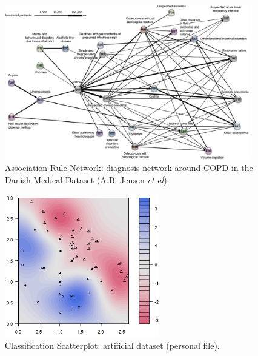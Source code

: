 \afterpage{\FloatBarrier}
\vfill
\newpage
\vfill
\begin{figure}[H]
\centering
\includegraphics[width=0.95\textwidth]{images/DV/COPD.png}
\caption[\small Association Rule Network: Danish Medical Dataset ]{\small Association Rule Network: diagnosis network around COPD in the Danish Medical Dataset (A.B. Jensen \textit{et al}).} \label{fig:ex_arn_copd}
\end{figure}
\afterpage{\FloatBarrier}
\vfill
\begin{figure}[H]
\centering
\includegraphics[width=0.6\textwidth]{images/DV/fig9.png}
\caption[\small Classification Scatterplot: artificial dataset ]{\small Classification Scatterplot: artificial dataset (personal file).} \label{fig:ex_cs_SVM}
\end{figure}
\afterpage{\FloatBarrier}
\vfill
\newpage
\vfill
